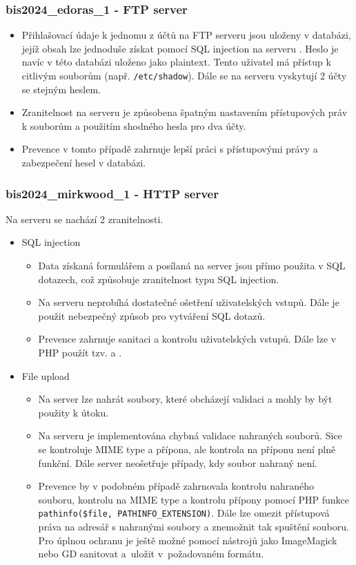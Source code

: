 \documentclass[a4paper, 11pt]{article}
\begin{document}
\subsubsection{bis2024\_edoras\_1 - FTP server}
\begin{itemize}
    \item Přihlašovací údaje k jednomu z účtů na FTP serveru jsou uloženy v databázi, jejíž obsah lze jednoduše získat pomocí SQL injection na serveru . Heslo je navíc v této databázi uloženo jako plaintext. Tento uživatel má přístup k citlivým souborům (např. \texttt{/etc/shadow}). Dále se na serveru vyskytují 2 účty se stejným heslem.
    \item Zranitelnost na serveru je způsobena špatným nastavením přístupových práv k souborům a použitím shodného hesla pro dva účty.
    \item Prevence v tomto případě zahrnuje lepší práci s přístupovými právy a zabezpečení hesel v databázi.
\end{itemize}


\subsubsection{bis2024\_mirkwood\_1 - HTTP server} 
Na serveru se nachází 2 zranitelnosti.
\begin{itemize}
    \item {SQL injection}
    \begin{itemize}
        \item Data získaná formulářem a posílaná na server jsou přímo použita v SQL dotazech, což způsobuje zranitelnost typu SQL injection.
        \item Na serveru neprobíhá dostatečné ošetření uživatelských vstupů. Dále je použit nebezpečný způsob pro vytváření SQL dotazů.
        \item Prevence zahrnuje sanitaci a kontrolu uživatelských vstupů. Dále lze v PHP použít tzv.  a .
    \end{itemize}
    \item {File upload}
    \begin{itemize}
        \item Na server lze nahrát soubory, které obcházejí validaci a mohly by být použity k útoku.
        \item Na serveru je implementována chybná validace nahraných souborů. Sice se kontroluje MIME type a přípona, ale kontrola na příponu není plně funkční. Dále server neošetřuje případy, kdy soubor nahraný není. 
        \item Prevence by v podobném případě zahrnovala kontrolu nahraného souboru, kontrolu na MIME type a kontrolu přípony pomocí PHP funkce \verb|pathinfo($file, PATHINFO_EXTENSION)|. Dále lze omezit přístupová práva na adresář s nahranými soubory a znemožnit tak spuštění souboru. Pro úplnou ochranu je ještě možné pomocí nástrojů jako ImageMagick nebo GD sanitovat a~uložit v~požadovaném formátu. 
    \end{itemize}
\end{itemize}
\end{document}
